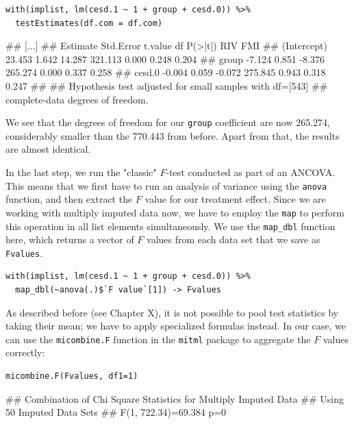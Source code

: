 \begin{lstlisting}
with(implist, lm(cesd.1 ~ 1 + group + cesd.0)) %>%
  testEstimates(df.com = df.com)
\end{lstlisting}

\begin{example}
## [...]
##              Estimate Std.Error   t.value       df P(>|t|)    RIV   FMI 
## (Intercept)    23.453     1.642    14.287  321.113   0.000  0.248 0.204 
## group          -7.124     0.851    -8.376  265.274   0.000  0.337 0.258 
## cesd.0         -0.004     0.059    -0.072  275.845   0.943  0.318 0.247 
## 
## Hypothesis test adjusted for small samples with df=[543]
## complete-data degrees of freedom.
\end{example}

We see that the degrees of freedom for our \texttt{group} coefficient are now 265.274, considerably smaller than the 770.443 from before. Apart from that, the results are almost identical. 

In the last step, we run the "classic" $F$-test conducted as part of an ANCOVA. This means that we first have to run an analysis of variance using the \texttt{anova} function, and then extract the $F$ value for our treatment effect. Since we are working with multiply imputed data now, we have to employ the \texttt{map} to perform this operation in all list elements simultaneously. We use the \texttt{map\_dbl} function here, which returns a vector of $F$ values from each data set that we save as \texttt{Fvalues}.

\begin{lstlisting}
with(implist, lm(cesd.1 ~ 1 + group + cesd.0)) %>%
  map_dbl(~anova(.)$`F value`[1]) -> Fvalues
\end{lstlisting}

As described before (see Chapter X), it is not possible to pool test statistics by taking their mean; we have to apply specialized formulas instead. In our case, we can use the \texttt{micombine.F} function in the \texttt{mitml} package to aggregate the $F$ values correctly:

\begin{lstlisting}
micombine.F(Fvalues, df1=1)
\end{lstlisting}

\begin{example}
## Combination of Chi Square Statistics for Multiply Imputed Data
## Using 50 Imputed Data Sets
## F(1, 722.34)=69.384     p=0 
\end{example}

